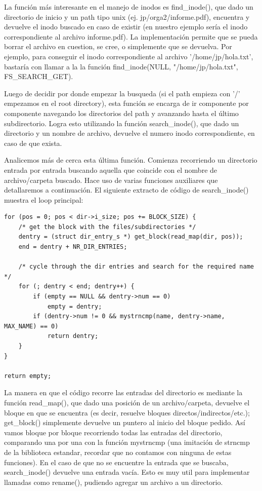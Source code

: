 La función más interesante en el manejo de inodos es find\_inode(), que dado un
directorio de inicio y un path tipo unix (ej. jp/orga2/informe.pdf), encuentra y
devuelve el inodo buscado en caso de existir (en nuestro ejemplo sería el inodo
correspondiente al archivo informe.pdf). La implementación permite que se pueda
borrar el archivo en cuestion, se cree, o simplemente que se devuelva. Por
ejemplo, para conseguir el inodo correspondiente al archivo '/home/jp/hola.txt',
bastaría con llamar a la la función find\_inode(NULL, "/home/jp/hola.txt",
FS\_SEARCH\_GET).

Luego de decidir por donde empezar la busqueda (si el path empieza con '/'
empezamos en el root directory), esta función se encarga de ir componente por
componente navegando los directorios del path y avanzando hasta el último
subdirectorio. Logra esto utilizando la función search\_inode(), que dado un
directorio y un nombre de archivo, devuelve el numero inodo correspondiente, en
caso de que exista.

Analicemos más de cerca esta última función. Comienza recorriendo un
directorio entrada por entrada buscando aquella que coincide con el nombre de
archivo/carpeta buscado. Hace uso de varias funciones auxiliares que
detallaremos a continuación. El siguiente extracto de código de search\_inode()
muestra el loop principal:

\begin{verbatim}
for (pos = 0; pos < dir->i_size; pos += BLOCK_SIZE) {
    /* get the block with the files/subdirectories */
    dentry = (struct dir_entry_s *) get_block(read_map(dir, pos));
    end = dentry + NR_DIR_ENTRIES;

    /* cycle through the dir entries and search for the required name */
    for (; dentry < end; dentry++) {
        if (empty == NULL && dentry->num == 0)
            empty = dentry;
        if (dentry->num != 0 && mystrncmp(name, dentry->name, MAX_NAME) == 0)
            return dentry;
    }
}

return empty;
\end{verbatim}

La manera en que el código recorre las entradas del directorio es mediante la
función read\_map(), que dado una posición de un archivo/carpeta, devuelve el
bloque en que se encuentra (es decir, resuelve bloques
directos/indirectos/etc.); get\_block() simplemente devuelve
un puntero al inicio del bloque pedido. Así vamos bloque por bloque recorriendo
todas las entradas del directorio, comparando una por una con la función
mystrncmp (una imitación de strncmp de la biblioteca estandar, recordar que no
contamos con ninguna de estas funciones). En el caso de que no se encuentre la
entrada que se buscaba, search\_inode() devuelve una entrada vacía. Esto es muy
util para implementar llamadas como rename(), pudiendo agregar un archivo a un
directorio.

